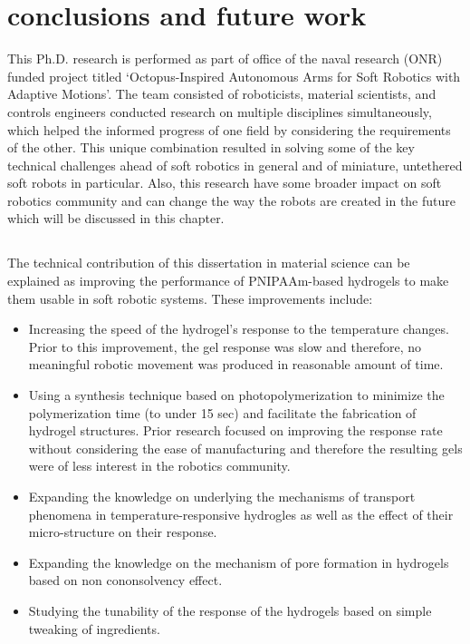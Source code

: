 \graphicspath{{Images/conclusion/}}

\chapter{conclusions and future work}
\label{chap:conclusion}
This Ph.D. research is performed as part of office of the naval research (ONR) funded project titled `Octopus-Inspired Autonomous Arms for Soft Robotics with Adaptive Motions'. The team consisted of roboticists, material scientists, and controls engineers conducted research on multiple disciplines simultaneously, which helped the informed progress of one field by considering the requirements of the other. This unique combination resulted in solving some of the key technical challenges ahead of soft robotics in general and of miniature, untethered soft robots in particular. Also, this research have some broader impact on soft robotics community and can change the way the robots are created in the future which will be discussed in this chapter.
\section{}
The technical contribution of this dissertation in material science can be explained as improving the performance of PNIPAAm-based hydrogels to make them usable in soft robotic systems. These improvements include:
\begin{itemize}
 \item Increasing the speed of the hydrogel's response to the temperature changes. Prior to this improvement, the gel response was slow and therefore, no meaningful robotic movement was produced in reasonable amount of time. 
 \item Using a synthesis technique based on photopolymerization to minimize the polymerization time (to under 15 sec) and facilitate the fabrication of hydrogel structures. Prior research focused on improving the response rate without considering the ease of manufacturing and therefore the resulting gels were of less interest in the robotics community.
 \item Expanding the knowledge on underlying the mechanisms of transport phenomena in temperature-responsive hydrogles as well as the effect of their micro-structure on their response. 
 \item Expanding the knowledge on the mechanism of pore formation in hydrogels based on non cononsolvency effect. 
 \item Studying the tunability of the response of the hydrogels based on simple tweaking of ingredients. 
\end{itemize}
	
